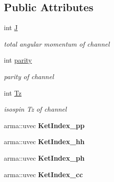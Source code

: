 \subsection*{Public Attributes}
\begin{DoxyCompactItemize}
\item 
\mbox{\label{classTwoBodyChannel_af9976c47e94db87fec18e1a546b9617f}} 
int \hyperlink{classTwoBodyChannel_af9976c47e94db87fec18e1a546b9617f}{J}
\begin{DoxyCompactList}\small\item\em total angular momentum of channel \end{DoxyCompactList}\item 
\mbox{\label{classTwoBodyChannel_a685363a37686469073bd1cef68af7d5c}} 
int \hyperlink{classTwoBodyChannel_a685363a37686469073bd1cef68af7d5c}{parity}
\begin{DoxyCompactList}\small\item\em parity of channel \end{DoxyCompactList}\item 
\mbox{\label{classTwoBodyChannel_a3f40dbd98bca44d04d1f5e016d4a3bbc}} 
int \hyperlink{classTwoBodyChannel_a3f40dbd98bca44d04d1f5e016d4a3bbc}{Tz}
\begin{DoxyCompactList}\small\item\em isospin Tz of channel \end{DoxyCompactList}\item 
\mbox{\label{classTwoBodyChannel_ac088eba6c0d526f966a7f0544e512f72}} 
arma\+::uvec {\bfseries Ket\+Index\+\_\+pp}
\item 
\mbox{\label{classTwoBodyChannel_acd538bd5dca3539c405fbb83277e131d}} 
arma\+::uvec {\bfseries Ket\+Index\+\_\+hh}
\item 
\mbox{\label{classTwoBodyChannel_a0379c61ac67f65a6bb167e9daf2c12fe}} 
arma\+::uvec {\bfseries Ket\+Index\+\_\+ph}
\item 
\mbox{\label{classTwoBodyChannel_ae26698f416e5b59d2a9ce1d8dbeb9454}} 
arma\+::uvec {\bfseries Ket\+Index\+\_\+cc}
\item 

\end{DoxyCompactItemize}
